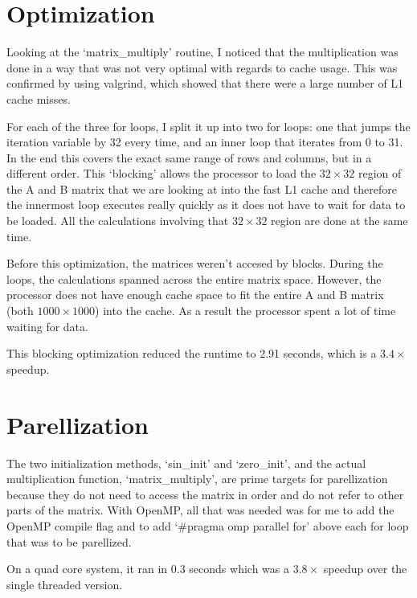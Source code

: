\documentclass[12pt]{article}
\begin{document}
\section{Optimization}
Looking at the `matrix\_multiply' routine, I noticed that the multiplication was done in a way that was not very optimal with regards to cache usage. This was confirmed by using valgrind, which showed that there were a large number of L1 cache misses.

For each of the three for loops, I split it up into two for loops: one that jumps the iteration variable by 32 every time, and an inner loop that iterates from 0 to 31. In the end this covers the exact same range of rows and columns, but in a different order. This `blocking' allows the processor to load the $32\times 32$ region of the A and B matrix that we are looking at into the fast L1 cache and therefore the innermost loop executes really quickly as it does not have to wait for data to be loaded. All the calculations involving that $32\times 32$ region are done at the same time.

Before this optimization, the matrices weren't accesed by blocks. During the loops, the calculations spanned across the entire matrix space. However, the processor does not have enough cache space to fit the entire A and B matrix (both $1000 \times 1000$) into the cache. As a result the processor spent a lot of time waiting for data.

This blocking optimization reduced the runtime to 2.91 seconds, which is a $3.4 \times$ speedup.

\section{Parellization}
The two initialization methods, `sin\_init' and `zero\_init', and the actual multiplication function, `matrix\_multiply', are prime targets for parellization because they do not need to access the matrix in order and do not refer to other parts of the matrix. With OpenMP, all that was needed was for me to add the OpenMP compile flag and to add `\#pragma omp parallel for' above each for loop that was to be parellized. 

On a quad core system, it ran in 0.3 seconds which was a $3.8\times$ speedup over the single threaded version.
\end{document}
